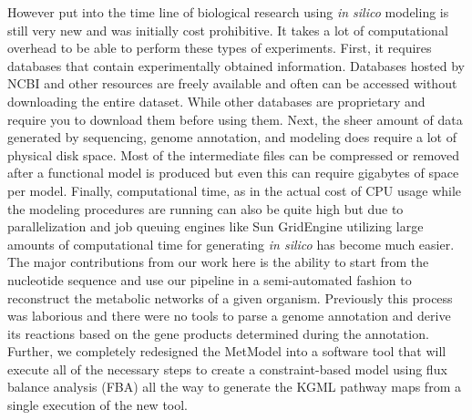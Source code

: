 \indent However put into the time line of biological research using \textit{in silico} modeling is still very new and was initially cost prohibitive.  It takes a lot of computational overhead to be able to perform these types of experiments.  First, it requires databases that contain experimentally obtained information. Databases hosted by NCBI and other resources are freely available and often can be accessed without downloading the entire dataset. While other databases are proprietary and require you to download them before using them.  Next, the sheer amount of data generated by sequencing, genome annotation, and modeling does require a lot of physical disk space. Most of the intermediate files can be compressed or removed after a functional model is produced but even this can require gigabytes of space per model.  Finally, computational time, as in the actual cost of CPU usage while the modeling procedures are running can also be quite high but due to parallelization and job queuing engines like Sun GridEngine utilizing large amounts of computational time for generating \textit{in silico} has become much easier.\\
%
%
%
\indent The major contributions from our work here is the ability to start from the nucleotide sequence and use our pipeline in a semi-automated fashion to reconstruct the metabolic networks of a given organism.  Previously this process was laborious and there were no tools to parse a genome annotation and derive its reactions based on the gene products determined during the annotation.  Further, we completely redesigned the MetModel into a software tool that will execute all of the necessary steps to create a constraint-based model using flux balance analysis (FBA) all the way to generate the KGML pathway maps from a single execution of the new tool.\\ 
%
%
%
